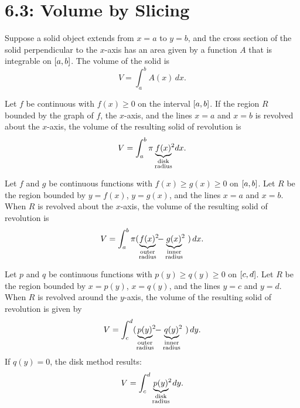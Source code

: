 \documentclass[../mathNotesPreamble]{subfiles}
\begin{document}
  \section*{6.3: Volume by Slicing}

  \begin{thmBox*}
    Suppose a solid object extends from $x=a$ to $y=b$, and the cross section of the solid perpendicular to the $x$-axis has an area given by a function $A$ that is integrable on ${\left[a,b\right]}$. The volume of the solid is
      \[V=\int_a^b A(x)\,dx.\]
  \end{thmBox*}

  \begin{thmBox*}
    Let $f$ be continuous with $f(x)\geq 0$ on the interval ${\left[a,b\right]}$. If the region $R$ bounded by the graph of $f$, the $x$-axis, and the lines $x=a$ and $x=b$ is revolved about the $x$-axis, the volume of the resulting solid of revolution is
      \[V=\int_a^b \pi\underbrace{f(x)^{\mathrlap{2}}}_{\substack{\textnormal{disk}\\\textnormal{radius}}}\,dx.\]
  \end{thmBox*}

  \begin{thmBox*}
    Let $f$ and $g$ be continuous functions with $f(x)\geq g(x)\geq 0$ on ${\left[a,b\right]}$. Let $R$ be the region bounded by $y=f(x)$, $y=g(x)$, and the lines $x=a$ and $x=b$. When $R$ is revolved about the $x$-axis, the volume of the resulting solid of revolution is
      \[V=\int_a^b \pi (\underbrace{f(x)^{\mathrlap{2}}}_{\substack{\textnormal{outer}\\\textnormal{radius}}}-\underbrace{g(x)^{\mathrlap{2}}}_{\substack{\textnormal{inner}\\\textnormal{radius}}}\phantom{^2})\,dx.\]
  \end{thmBox*}

  \begin{thmBox*}
    Let $p$ and $q$ be continuous functions with $p(y)\geq q(y)\geq 0$ on ${\left[c,d\right]}$. Let $R$ be the region bounded by $x=p(y)$, $x=q(y)$, and the lines $y=c$ and $y=d$. When $R$ is revolved around the $y$-axis, the volume of the resulting solid of revolution is given by
      \[V=\int_c^d (\underbrace{p(y)^{\mathrlap{2}}}_{\substack{\textnormal{outer}\\\textnormal{radius}}}-\underbrace{q(y)^{\mathrlap{2}}}_{\substack{\textnormal{inner}\\\textnormal{radius}}}\phantom{^2})\,dy.\]
      If $q(y)=0$, the disk method results:
        \[V=\int_c^d \underbrace{p(y)^{\mathrlap{2}}}_{\substack{\textnormal{disk}\\\textnormal{radius}}}\,dy.\]
  \end{thmBox*} %
\end{document}
